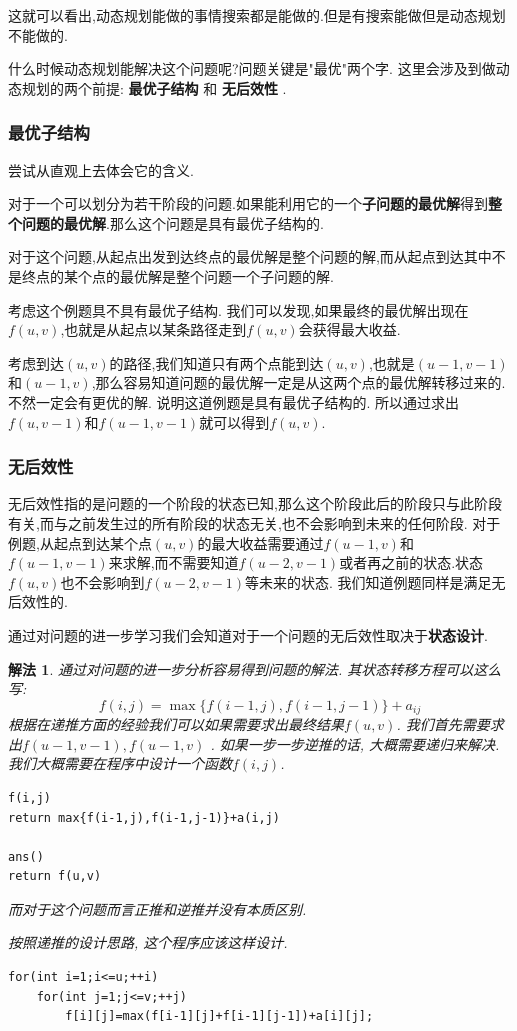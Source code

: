 \documentclass{article}
\theoremstyle{nonumberplain}
\newtheorem{solve}{解法}
\begin{document}
这就可以看出,动态规划能做的事情搜索都是能做的.但是有搜索能做但是动态规划不能做的.

什么时候动态规划能解决这个问题呢?问题关键是"最优"两个字.
这里会涉及到做动态规划的两个前提: \textbf{最优子结构} 和 \textbf{无后效性} .


\subsubsection{最优子结构}尝试从直观上去体会它的含义.

对于一个可以划分为若干阶段的问题.如果能利用它的一个\textbf{子问题的最优解}得到\textbf{整个问题的最优解}.那么这个问题是具有最优子结构的.

对于这个问题,从起点出发到达终点的最优解是整个问题的解,而从起点到达其中不是终点的某个点的最优解是整个问题一个子问题的解.

考虑这个例题具不具有最优子结构.
我们可以发现,如果最终的最优解出现在$f(u,v)$,也就是从起点以某条路径走到$f(u,v)$会获得最大收益.

考虑到达$(u,v)$的路径,我们知道只有两个点能到达$(u,v)$,也就是$(u-1,v-1)$和$(u-1,v)$,那么容易知道问题的最优解一定是从这两个点的最优解转移过来的.不然一定会有更优的解.
说明这道例题是具有最优子结构的.
所以通过求出$f(u,v-1)$和$f(u-1,v-1)$就可以得到$f(u,v)$.




\subsubsection{无后效性}
无后效性指的是问题的一个阶段的状态已知,那么这个阶段此后的阶段只与此阶段有关,而与之前发生过的所有阶段的状态无关,也不会影响到未来的任何阶段.
对于例题,从起点到达某个点$(u,v)$的最大收益需要通过$f(u-1,v)$和$f(u-1,v-1)$来求解,而不需要知道$f(u-2,v-1)$或者再之前的状态.状态$f(u,v)$也不会影响到$f(u-2,v-1)$等未来的状态.
我们知道例题同样是满足无后效性的.

通过对问题的进一步学习我们会知道对于一个问题的无后效性取决于\textbf{状态设计}.


\begin{solve}
	通过对问题的进一步分析容易得到问题的解法.
	其状态转移方程可以这么写:
	\begin{equation*}
		f(i,j)=\max\{f(i-1,j),f(i-1,j-1)\}+a_{ij}
	\end{equation*}
	根据在递推方面的经验我们可以如果需要求出最终结果$f(u,v)$.
	我们首先需要求出$f(u-1,v-1), f(u-1,v)$ .
	如果一步一步逆推的话, 大概需要递归来解决.
	我们大概需要在程序中设计一个函数$f(i,j)$.
\begin{verbatim}
f(i,j)
return max{f(i-1,j),f(i-1,j-1)}+a(i,j)

ans()
return f(u,v)
\end{verbatim}
而对于这个问题而言正推和逆推并没有本质区别.

按照递推的设计思路, 这个程序应该这样设计.
\begin{verbatim}
for(int i=1;i<=u;++i)
	for(int j=1;j<=v;++j)
		f[i][j]=max(f[i-1][j]+f[i-1][j-1])+a[i][j];
\end{verbatim}
\end{solve}
\end{document}
